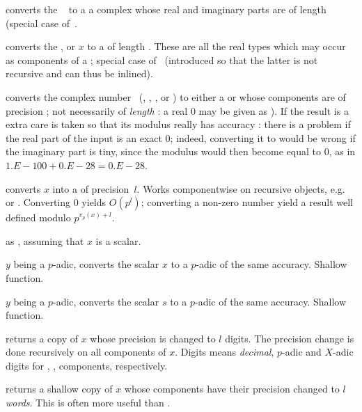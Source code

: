  converts the ~ to a
a complex whose real and imaginary parts are  of length 
(special case of~.

 converts the
,  or  $x$ to a  of length .
These are all the real types which may occur as components of a
; special case of~ (introduced so that the latter is
not recursive and can thus be inlined).

 converts the complex number~
(, , ,  or ) to either
a  or  whose components are  of precision
; not necessarily of \emph{length} : a real $0$ may be
given as ). If the result is a  extra care is
taken so that its modulus really has accuracy : there is a problem
if the real part of the input is an exact $0$; indeed, converting it to
 would be wrong if the imaginary part is tiny, since the
modulus would then become equal to $0$, as in $1.E-100 + 0.E-28 = 0.E-28$.

 converts $x$ into a 
of precision~$l$. Works componentwise on recursive objects,
e.g.~ or . Converting $0$ yields $O(p^l)$; converting a
non-zero number yield a result well defined modulo $p^{v_p(x) + l}$.

 as , assuming that $x$
is a scalar.

 $y$ being a $p$-adic, converts the scalar $x$
to a $p$-adic of the same accuracy. Shallow function.

 $y$ being a $p$-adic, converts the scalar $s$
to a $p$-adic of the same accuracy. Shallow function.

 returns a copy of $x$ whose precision is
changed to $l$ digits. The precision change is done recursively on all
components of $x$. Digits means \emph{decimal}, $p$-adic and $X$-adic digits
for , ,  components, respectively.

 returns a shallow copy of $x$ whose
 components have their precision changed to $l$ \emph{words}. This
is often more useful than .

